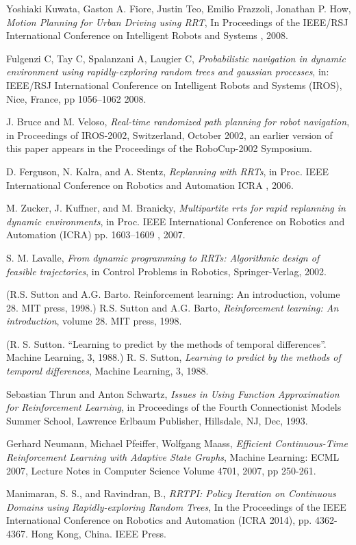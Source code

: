\documentclass[MTech]{iitmdiss}
\begin{document}
\begin{thebibliography}{99}
	Yoshiaki Kuwata, Gaston A. Fiore, Justin Teo, Emilio Frazzoli, Jonathan P. How,
  \emph{Motion Planning for Urban Driving using RRT},
	In Proceedings of the IEEE/RSJ International Conference on Intelligent Robots and Systems , 
	2008.
	
	Fulgenzi C, Tay C, Spalanzani A, Laugier C,
  \emph{Probabilistic navigation in dynamic environment using rapidly-exploring random trees and gaussian processes},
	in: IEEE/RSJ International Conference on Intelligent Robots and Systems (IROS), Nice, France, pp 1056–1062
	2008.	
	
	J. Bruce and M. Veloso,
  \emph{Real-time randomized path planning for robot navigation},
	in Proceedings of IROS-2002, Switzerland, October 2002, an earlier version of this paper appears in the Proceedings of the RoboCup-2002 Symposium.
	
	D. Ferguson, N. Kalra, and A. Stentz,
  \emph{Replanning with RRTs},
	in Proc. IEEE International Conference on Robotics and Automation ICRA ,
	 2006. 
	 
	M. Zucker, J. Kuffner, and M. Branicky,
  \emph{Multipartite rrts for rapid replanning in dynamic environments},
	in Proc. IEEE International Conference on Robotics and Automation (ICRA) pp. 1603–1609 , 
	2007.


	S. M. Lavalle,
  \emph{From dynamic programming to RRTs: Algorithmic design of feasible trajectories},
	in Control Problems in Robotics, Springer-Verlag,
 2002.
 
 (R.S. Sutton and A.G. Barto. Reinforcement learning: An introduction, volume 28. MIT press, 1998.) 
	R.S. Sutton and A.G. Barto,
  \emph{Reinforcement learning: An introduction},
	volume 28. MIT press, 
	1998.
 
 (R. S. Sutton. “Learning to predict by the methods of temporal differences”. Machine Learning, 3, 1988.)
	R. S. Sutton,
  \emph{Learning to predict by the methods of temporal differences},
	Machine Learning, 3, 
	1988.
	
	Sebastian Thrun and Anton Schwartz,
  \emph{Issues in Using Function Approximation for Reinforcement Learning},
	in Proceedings of the Fourth Connectionist Models Summer School, Lawrence Erlbaum Publisher, Hillsdale, NJ, Dec,
	1993.
	
	Gerhard Neumann, Michael Pfeiffer, Wolfgang Maass,
  \emph{Efficient Continuous-Time Reinforcement Learning with Adaptive State Graphs},
	Machine Learning: ECML 2007, Lecture Notes in Computer Science Volume 4701, 2007, pp 250-261.



	Manimaran, S. S., and Ravindran, B.,
  \emph{RRTPI: Policy Iteration on Continuous Domains using Rapidly-exploring Random Trees},
	 In the Proceedings of the IEEE International Conference on Robotics and Automation (ICRA 2014), pp. 4362-4367. Hong Kong, China. IEEE Press.
\end{thebibliography}

\end{document}
